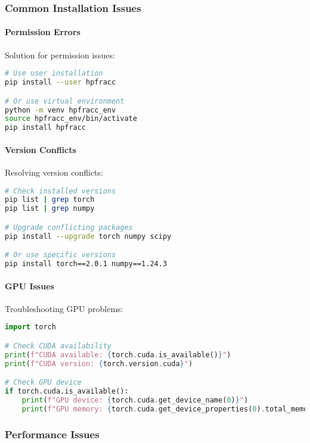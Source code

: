 \subsubsection{Common Installation Issues}

\paragraph{Permission Errors}
Solution for permission issues:

\begin{lstlisting}[language=bash, caption=Permission Fix]
# Use user installation
pip install --user hpfracc

# Or use virtual environment
python -m venv hpfracc_env
source hpfracc_env/bin/activate
pip install hpfracc
\end{lstlisting}

\paragraph{Version Conflicts}
Resolving version conflicts:

\begin{lstlisting}[language=bash, caption=Version Conflict Resolution]
# Check installed versions
pip list | grep torch
pip list | grep numpy

# Upgrade conflicting packages
pip install --upgrade torch numpy scipy

# Or use specific versions
pip install torch==2.0.1 numpy==1.24.3
\end{lstlisting}

\paragraph{GPU Issues}
Troubleshooting GPU problems:

\begin{lstlisting}[language=python, caption=GPU Troubleshooting]
import torch

# Check CUDA availability
print(f"CUDA available: {torch.cuda.is_available()}")
print(f"CUDA version: {torch.version.cuda}")

# Check GPU device
if torch.cuda.is_available():
    print(f"GPU device: {torch.cuda.get_device_name(0)}")
    print(f"GPU memory: {torch.cuda.get_device_properties(0).total_memory / 1e9:.1f} GB")
\end{lstlisting}

\subsubsection{Performance Issues}

